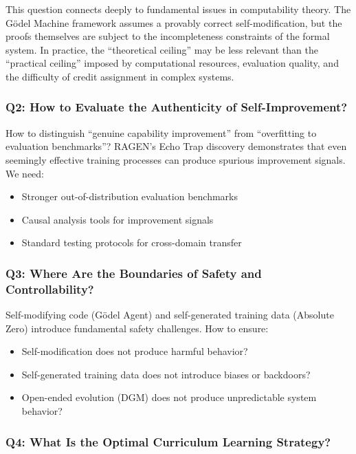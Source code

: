 This question connects deeply to fundamental issues in computability theory. The G\"{o}del Machine framework assumes a provably correct self-modification, but the proofs themselves are subject to the incompleteness constraints of the formal system. In practice, the ``theoretical ceiling'' may be less relevant than the ``practical ceiling'' imposed by computational resources, evaluation quality, and the difficulty of credit assignment in complex systems.

\subsubsection{Q2: How to Evaluate the Authenticity of Self-Improvement?}

How to distinguish ``genuine capability improvement'' from ``overfitting to evaluation benchmarks''? RAGEN's Echo Trap discovery demonstrates that even seemingly effective training processes can produce spurious improvement signals. We need:
\begin{itemize}
\item Stronger out-of-distribution evaluation benchmarks
\item Causal analysis tools for improvement signals
\item Standard testing protocols for cross-domain transfer
\end{itemize}

\subsubsection{Q3: Where Are the Boundaries of Safety and Controllability?}

Self-modifying code (G\"{o}del Agent) and self-generated training data (Absolute Zero) introduce fundamental safety challenges. How to ensure:
\begin{itemize}
\item Self-modification does not produce harmful behavior?
\item Self-generated training data does not introduce biases or backdoors?
\item Open-ended evolution (DGM) does not produce unpredictable system behavior?
\end{itemize}

\subsubsection{Q4: What Is the Optimal Curriculum Learning Strategy?}

